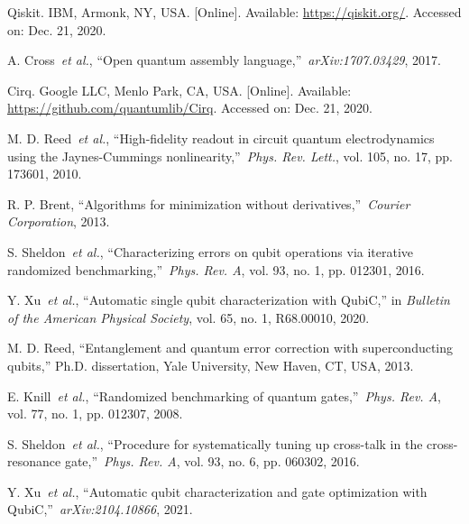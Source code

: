 \documentclass{ieeetran}
\begin{document}
\begin{thebibliography}{00}
 Qiskit. IBM, Armonk, NY, USA. [Online]. Available: 
\ul{https://qiskit.org/}. Accessed on: Dec. 21, 2020.

 A. Cross~\emph{et al.}, ``Open quantum assembly language,''~\emph{arXiv:1707.03429}, 2017.

 Cirq. Google LLC, Menlo Park, CA, USA. [Online]. Available: 
\ul{https://github.com/quantumlib/Cirq}. Accessed on: Dec. 21, 2020.


 M. D. Reed~\emph{et al.}, ``High-fidelity readout in circuit quantum electrodynamics using the Jaynes-Cummings nonlinearity,''~\emph{Phys. Rev. Lett.}, vol. 105, no. 17, pp. 173601, 2010.

 R. P. Brent, ``Algorithms for minimization without derivatives,''~\emph{Courier Corporation}, 2013. 

 S. Sheldon~\emph{et al.}, ``Characterizing errors on qubit operations via iterative randomized benchmarking,''~\emph{Phys. Rev. A}, vol. 93, no. 1, pp. 012301, 2016.

 Y. Xu~\emph{et al.}, ``Automatic single qubit characterization with QubiC,'' in \emph{Bulletin of the American Physical Society}, vol. 65, no. 1, R68.00010, 2020.


 M. D. Reed, ``Entanglement and quantum error correction with superconducting qubits,'' Ph.D. dissertation, Yale University, New Haven, CT, USA, 2013.

 E. Knill~\emph{et al.}, ``Randomized benchmarking of quantum gates,''~\emph{Phys. Rev. A}, vol. 77, no. 1, pp. 012307, 2008.

 S. Sheldon~\emph{et al.}, ``Procedure for systematically tuning up cross-talk in the cross-resonance gate,''~\emph{Phys. Rev. A}, vol. 93, no. 6, pp. 060302, 2016.

 Y. Xu~\emph{et al.}, ``Automatic qubit characterization and gate optimization with QubiC,''~\emph{arXiv:2104.10866}, 2021.


\end{thebibliography}
\end{document}
